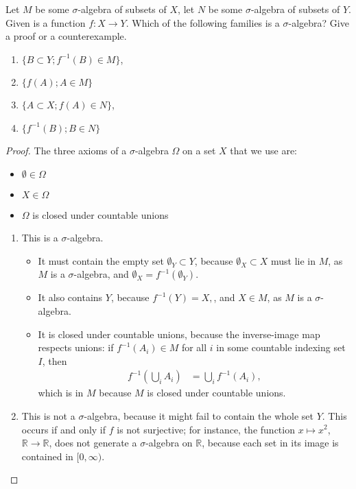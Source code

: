 \documentclass[12pt]{article}
\newcommand{\R}{\mathbb{R}}
\theoremstyle{definition}
\newenvironment{problem}[2][Problem]{\begin{trivlist}
\item[\hskip \labelsep {\bfseries #1}\hskip \labelsep {\bfseries #2.}]}{\end{trivlist}}
\begin{document}
\begin{problem}{5}
Let $M$ be some $\sigma$-algebra of subsets of $X$, let $N$ be some $\sigma$-algebra of subsets of $Y$. Given is a function $f: X \to Y$. Which of the following families is a $\sigma$-algebra? Give a proof or a counterexample.
\begin{enumerate}[label=\alph*)]
    \item $\{B \subset Y; f^{-1}(B) \in M\}$,
    \item $\{f(A); A \in M\}$
    \item $\{A \subset X; f(A) \in N\}$,
    \item $\{f^{-1}(B); B \in N\}$
\end{enumerate}
\begin{proof}
	The three axioms of a $\sigma$-algebra $\Omega$ on a set $X$ that we use are:
	\begin{itemize}
		\item $\emptyset \in \Omega$
		\item $X \in \Omega$
		\item $\Omega$ is closed under countable unions
	\end{itemize}
\begin{enumerate}[label=\alph*)]
\item This is a $\sigma$-algebra.
	    \begin{itemize}
		    \item It must contain the empty set $\emptyset_Y \subset Y$, because $\emptyset_X \subset X$  must lie in $M$, as $M$ is a $\sigma$-algebra, and $\emptyset_X = f^{-1}(\emptyset_Y)$.
		    \item It also contains $Y$, because $f^{-1}(Y) = X,$, and $X \in M$, as $M$ is a $\sigma$-algebra.
		    \item It is closed under countable unions, because the inverse-image map respects unions: if 	$f^{-1}(A_i) \in M$ for all $i$ in some countable indexing set $I$, then 
			    \begin{align*}
				    f^{-1}\left( \bigcup_i A_i \right) &= \bigcup_i f^{-1}(A_i),
			    \end{align*}
			    which is in $M$ because $M$ is closed under countable unions.
		    \end{itemize}
		    \item This is not a $\sigma$-algebra, because it might fail to contain the whole set $Y$. This occurs if and only if $f$ is not surjective; for instance, the function $x \mapsto x^2$, $\R \to \R$, does not generate a $\sigma$-algebra on $\R$, because each set in its image is contained in $[0, \infty)$.

\end{enumerate}
\end{proof}
\end{problem}
\end{document}

